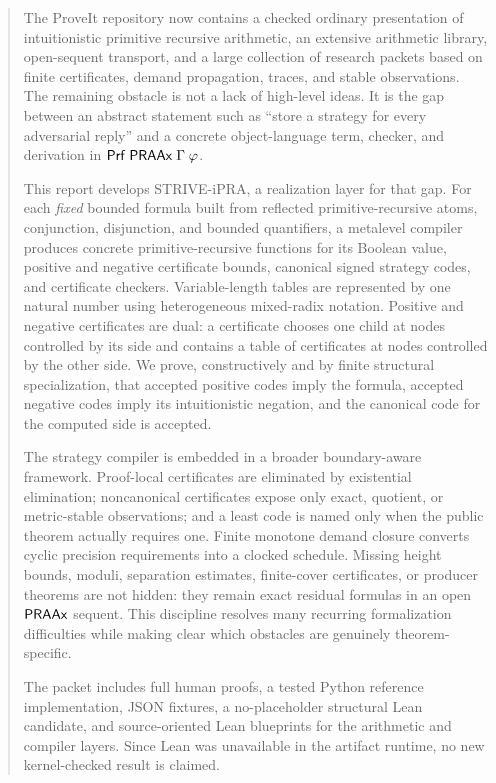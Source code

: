 \begin{abstract}
The ProveIt repository now contains a checked ordinary presentation of
intuitionistic primitive recursive arithmetic, an extensive arithmetic library,
open-sequent transport, and a large collection of research packets based on
finite certificates, demand propagation, traces, and stable observations.  The
remaining obstacle is not a lack of high-level ideas.  It is the gap between an
abstract statement such as ``store a strategy for every adversarial reply'' and
a concrete object-language term, checker, and derivation in
\(\Prf\;\PRAAx\;\Gamma\;\varphi\).

This report develops STRIVE-iPRA, a realization layer for that gap.  For each
\emph{fixed} bounded formula built from reflected primitive-recursive atoms,
conjunction, disjunction, and bounded quantifiers, a metalevel compiler produces
concrete primitive-recursive functions for its Boolean value, positive and
negative certificate bounds, canonical signed strategy codes, and certificate
checkers.  Variable-length tables are represented by one natural number using
heterogeneous mixed-radix notation.  Positive and negative certificates are
dual: a certificate chooses one child at nodes controlled by its side and
contains a table of certificates at nodes controlled by the other side.  We
prove, constructively and by finite structural specialization, that accepted
positive codes imply the formula, accepted negative codes imply its
intuitionistic negation, and the canonical code for the computed side is
accepted.

The strategy compiler is embedded in a broader boundary-aware framework.
Proof-local certificates are eliminated by existential elimination;
noncanonical certificates expose only exact, quotient, or metric-stable
observations; and a least code is named only when the public theorem actually
requires one.  Finite monotone demand closure converts cyclic precision
requirements into a clocked schedule.  Missing height bounds, moduli,
separation estimates, finite-cover certificates, or producer theorems are not
hidden: they remain exact residual formulas in an open \(\PRAAx\) sequent.
This discipline resolves many recurring formalization difficulties while
making clear which obstacles are genuinely theorem-specific.

The packet includes full human proofs, a tested Python reference implementation,
JSON fixtures, a no-placeholder structural Lean candidate, and
source-oriented Lean blueprints for the arithmetic and compiler layers.  Since
Lean was unavailable in the artifact runtime, no new kernel-checked result is
claimed.
\end{abstract}

